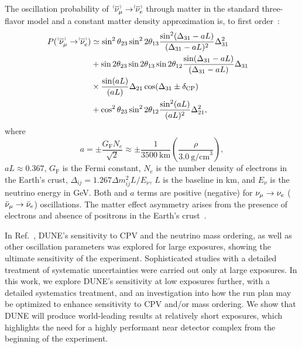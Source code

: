 The oscillation probability of $\;\nu^{\bracketbar}_\mu \rightarrow \nu^{\bracketbar}_e$ through matter in the standard three-flavor model and a constant matter density approximation is, to first order~\cite{Nunokawa:2007qh}:
\begin{equation}
  \begin{aligned}
    P(\;\nu^{\bracketbar}_\mu \rightarrow \nu^{\bracketbar}_e) & \simeq \sin^2 \theta_{23} \sin^2 2 \theta_{13} 
    \frac{ \sin^2(\Delta_{31} - aL)}{(\Delta_{31}-aL)^2} \Delta_{31}^2 \\
    & + \sin 2 \theta_{23} \sin 2 \theta_{13} \sin 2 \theta_{12}\frac{ \sin(\Delta_{31} - aL)}{(\Delta_{31}-aL)} \Delta_{31} \\
    &\times \frac{\sin(aL)}{(aL)} \Delta_{21} \cos (\Delta_{31} \pm \deltacp) & \\
    & + \cos^2 \theta_{23} \sin^2 2 \theta_{12} \frac {\sin^2(aL)}{(aL)^2} \Delta_{21}^2,
  \end{aligned}
  \label{eqn:appprob}
\end{equation}
where
\begin{equation*}
  a = \pm \frac{G_{\mathrm{F}}N_e}{\sqrt{2}} \approx \pm\frac{1}{3500~\mathrm{km}}\left(\frac{\rho}{3.0~\mathrm{g/cm}^{3}}\right),
\end{equation*}
$aL \approx 0.367$, $G_{\mathrm{F}}$ is the Fermi constant, $N_e$ is the number density of electrons in the Earth's crust, $\Delta_{ij} = 1.267 \Delta m^2_{ij} L/E_\nu$, $L$ is the baseline in km, and $E_\nu$ is the neutrino energy in GeV.
Both \deltacp and $a$ terms are positive (negative) for $\nu_\mu \to \nu_e$ ($\bar\nu_\mu \to \bar\nu_e$) oscillations. The matter effect asymmetry arises from the presence of electrons and absence of positrons in the Earth's crust~\cite{Wolfenstein:1977ue,Mikheev:1986gs}.

In Ref.~\cite{Abi:2020qib}, DUNE's sensitivity to CPV and the neutrino mass ordering, as well as other oscillation parameters was explored for large exposures, showing the ultimate sensitivity of the experiment. Sophisticated studies with a detailed treatment of systematic uncertainties were carried out only at large exposures. In this work, we explore DUNE's sensitivity at low exposures further, with a detailed systematics treatment, and an investigation into how the run plan may be optimized to enhance sensitivity to CPV and/or mass ordering. We show that DUNE will produce world-leading results at relatively short exposures, which highlights the need for a highly performant near detector complex from the beginning of the experiment. 

